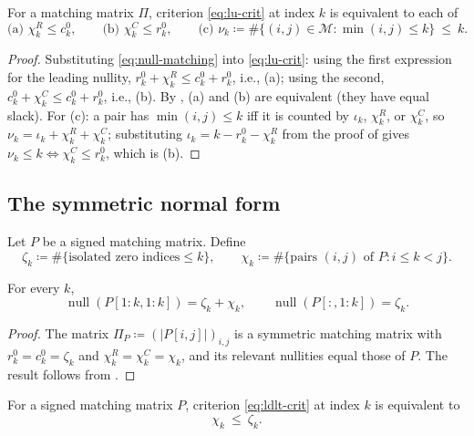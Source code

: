 \documentclass[preprint,12pt]{elsarticle}
\theoremstyle{plain}
\theoremstyle{nonumberplain}
\newtheorem{proof}{Proof}
\numberwithin{equation}{section}
\DeclareMathOperator{\nl}{null}
\newcommand{\M}{\mathcal{M}}
\numberwithin{theorem}{section}
\begin{document}
\begin{lemma}\label{lem:comb-lu}
  For a matching matrix $\Pi$, criterion \cref{eq:lu-crit} at index $k$ is equivalent to each of
  \[
    \text{(a) } \chi^R_k \le c^0_k,
    \qquad
    \text{(b) } \chi^C_k \le r^0_k,
    \qquad
    \text{(c) } \nu_k \coloneq \#\{(i,j) \in \M \colon \min(i,j) \le k\} \ \le\ k .
  \]
\end{lemma}

\begin{proof}
  Substituting \cref{eq:null-matching} into \cref{eq:lu-crit}: using the first expression for the leading nullity, $r^0_k + \chi^R_k \le c^0_k + r^0_k$, i.e., (a); using the second, $c^0_k + \chi^C_k \le c^0_k + r^0_k$, i.e., (b).  By , (a) and (b) are equivalent (they have equal slack).  For (c): a pair has $\min(i,j) \le k$ iff it is counted by $\iota_k$, $\chi^R_k$, or $\chi^C_k$, so $\nu_k = \iota_k + \chi^R_k + \chi^C_k$; substituting $\iota_k = k - r^0_k - \chi^R_k$ from the proof of  gives $\nu_k \le k \iff \chi^C_k \le r^0_k$, which is (b).
\end{proof}

\subsection{The symmetric normal form}

Let $P$ be a signed matching matrix.  Define
\[
  \zeta_k \coloneq \#\{\text{isolated zero indices} \le k\},
  \qquad
  \chi_k \coloneq \#\{\text{pairs } (i,j) \text{ of } P \colon i \le k < j\} .
\]

\begin{corollary}\label{cor:null-sym-matching}
  For every $k$,
  \[
    \nl(P[1:k,1:k]) = \zeta_k + \chi_k,
    \qquad
    \nl(P[:,1:k]) = \zeta_k .
  \]
\end{corollary}

\begin{proof}
  The matrix $\Pi_P \coloneq (|P[i,j]|)_{i,j}$ is a symmetric matching matrix with $r_k^0=c_k^0=\zeta_k$ and $\chi_k^R=\chi_k^C=\chi_k$, and its relevant nullities equal those of $P$.  The result follows from .
\end{proof}

\begin{lemma}\label{lem:comb-sym}
  For a signed matching matrix $P$, criterion \cref{eq:ldlt-crit} at
  index $k$ is equivalent to
  \begin{equation}\label{eq:prefix-sym}
    \chi_k \ \le\ \zeta_k .
  \end{equation}
\end{lemma}
\end{document}
